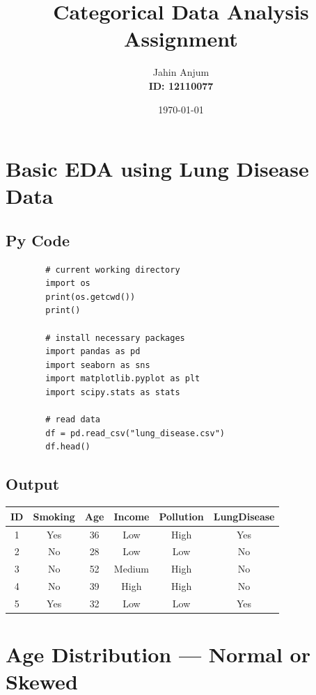 \documentclass[a4paper,12pt]{article}
\begin{document}
	
	\title{Categorical Data Analysis Assignment}
	\author{Jahin Anjum \\ \textbf{ID: 12110077}}
	\date{\today}
	\maketitle
	
	\tableofcontents
	\newpage

	
	\section{Basic EDA using Lung Disease Data}
	
	\subsection{Py Code}
	\begin{lstlisting}
		# current working directory
		import os
		print(os.getcwd())
		print()
		
		# install necessary packages
		import pandas as pd
		import seaborn as sns
		import matplotlib.pyplot as plt
		import scipy.stats as stats
		
		# read data
		df = pd.read_csv("lung_disease.csv")
		df.head()
	\end{lstlisting}
	
	\subsection{Output}
	\begin{center}
		\begin{tabular}{|c|c|c|c|c|c|}
			\hline
			\textbf{ID} & \textbf{Smoking} & \textbf{Age} & \textbf{Income} & \textbf{Pollution} & \textbf{LungDisease} \\
			\hline
			1 & Yes & 36 & Low & High & Yes \\
			2 & No & 28 & Low & Low & No \\
			3 & No & 52 & Medium & High & No \\
			4 & No & 39 & High & High & No \\
			5 & Yes & 32 & Low & Low & Yes \\
			\hline
		\end{tabular}
	\end{center}
\section{Age Distribution — Normal or Skewed}
\end{document}
